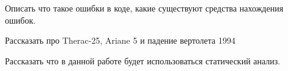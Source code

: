 \intro
Описать что такое ошибки в коде, какие существуют средства нахождения ошибок.

Рассказать про Therac-25, Ariane 5 и падение вертолета 1994

Рассказать что в данной работе будет использоваться статический анализ.

